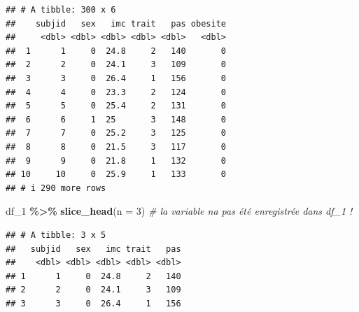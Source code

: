 \documentclass[
]{book}
\newenvironment{Shaded}{\begin{snugshade}}{\end{snugshade}}
\newcommand{\AttributeTok}[1]{\textcolor[rgb]{0.13,0.29,0.53}{#1}}
\newcommand{\CommentTok}[1]{\textcolor[rgb]{0.56,0.35,0.01}{\textit{#1}}}
\newcommand{\DecValTok}[1]{\textcolor[rgb]{0.00,0.00,0.81}{#1}}
\newcommand{\DocumentationTok}[1]{\textcolor[rgb]{0.56,0.35,0.01}{\textbf{\textit{#1}}}}
\newcommand{\FunctionTok}[1]{\textcolor[rgb]{0.13,0.29,0.53}{\textbf{#1}}}
\newcommand{\NormalTok}[1]{#1}
\newcommand{\OtherTok}[1]{\textcolor[rgb]{0.56,0.35,0.01}{#1}}
\newcommand{\SpecialCharTok}[1]{\textcolor[rgb]{0.81,0.36,0.00}{\textbf{#1}}}
\begin{document}
\begin{Shaded}
\end{Shaded}

\begin{verbatim}
## # A tibble: 300 x 6
##    subjid   sex   imc trait   pas obesite
##     <dbl> <dbl> <dbl> <dbl> <dbl>   <dbl>
##  1      1     0  24.8     2   140       0
##  2      2     0  24.1     3   109       0
##  3      3     0  26.4     1   156       0
##  4      4     0  23.3     2   124       0
##  5      5     0  25.4     2   131       0
##  6      6     1  25       3   148       0
##  7      7     0  25.2     3   125       0
##  8      8     0  21.5     3   117       0
##  9      9     0  21.8     1   132       0
## 10     10     0  25.9     1   133       0
## # i 290 more rows
\end{verbatim}

\begin{Shaded}
\begin{Highlighting}[]
\NormalTok{df\_1 }\SpecialCharTok{\%\textgreater{}\%} \FunctionTok{slice\_head}\NormalTok{(}\AttributeTok{n =} \DecValTok{3}\NormalTok{) }\CommentTok{\# la variable n\textquotesingle{}a pas été enregistrée dans df\_1 !}
\end{Highlighting}
\end{Shaded}

\begin{verbatim}
## # A tibble: 3 x 5
##   subjid   sex   imc trait   pas
##    <dbl> <dbl> <dbl> <dbl> <dbl>
## 1      1     0  24.8     2   140
## 2      2     0  24.1     3   109
## 3      3     0  26.4     1   156
\end{verbatim}

\begin{Shaded}
\end{Shaded}
\end{document}
